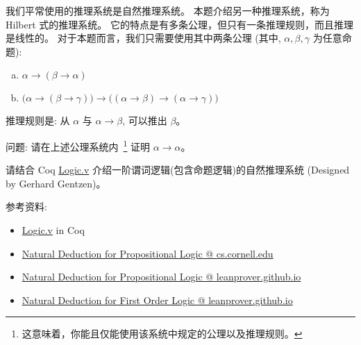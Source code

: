 \documentclass[a4paper, justified]{tufte-handout}
\begin{document}
\begin{solution}
\end{solution}

\beginoptional
\begin{problem}
  我们平常使用的推理系统是自然推理系统。
  本题介绍另一种推理系统，称为 Hilbert 式的推理系统。
  它的特点是有多条公理，但只有一条推理规则，而且推理是线性的。
  对于本题而言，我们只需要使用其中两条公理 
  (其中, $\alpha, \beta, \gamma$ 为任意命题):
  \begin{enumerate}[(a)]
    \item $\alpha \to (\beta \to \alpha)$
    \item $\big(\alpha \to (\beta \to \gamma)\big) \to 
      \big((\alpha \to \beta) \to (\alpha \to \gamma) \big)$
    \end{enumerate}
  推理规则是: 从 $\alpha$ 与 $\alpha \to \beta$, 可以推出 $\beta$。

  \vspace{8pt}
  \noindent 问题: 请在上述公理系统内~\footnote{这意味着，你能且仅能使用该系统中规定的公理以及推理规则。}
  证明 $\alpha \to \alpha$。
\end{problem}

\begin{solution}
\end{solution}

\beginot
\begin{ot}[自然推理系统]
  请结合 Coq 
  \href{https://github.com/hengxin/problem-solving-class-coq/blob/master/2019-1-coq/Logic.v}{Logic.v}
  介绍一阶谓词逻辑(包含命题逻辑)的自然推理系统 (Designed by Gerhard Gentzen)。

  参考资料:
  \begin{itemize}
    \item \href{https://github.com/hengxin/problem-solving-class-coq/blob/master/2019-1-coq/Logic.v}{Logic.v} in Coq
    \item \href{https://www.cs.cornell.edu/courses/cs3110/2013sp/lectures/lec15-logic-contd/lec15.html}{Natural Deduction for Propositional Logic @ cs.cornell.edu}
    \item \href{http://leanprover.github.io/logic\_and\_proof/natural\_deduction\_for\_propositional\_logic.html}
      {Natural Deduction for Propositional Logic @ leanprover.github.io}
    \item \href{http://leanprover.github.io/logic\_and\_proof/natural\_deduction\_for\_first\_order\_logic.html}
      {Natural Deduction for First Order Logic @ leanprover.github.io}
  \end{itemize}
\end{ot}
\end{document}
